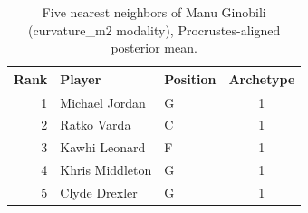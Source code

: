 \begin{table}[htbp]
  \centering\small
  \begin{tabular}{rllc}
    \toprule
    Rank & Player & Position & Archetype \\
    \midrule
    1 & Michael Jordan & G & 1 \\
    2 & Ratko Varda & C & 1 \\
    3 & Kawhi Leonard & F & 1 \\
    4 & Khris Middleton & G & 1 \\
    5 & Clyde Drexler & G & 1 \\
    \bottomrule
  \end{tabular}
  \caption{Five nearest neighbors of Manu Ginobili (curvature_m2 modality), Procrustes-aligned posterior mean.}
  \label{tab:Manu_Ginobili_neighbors_curvature_m2}
\end{table}

